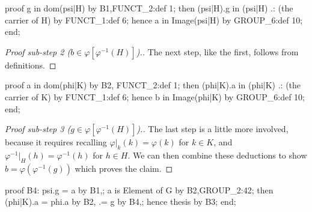 \nwenddocs{}\endmoddef\nwstartdeflinemarkup{}\nwenddeflinemarkup
proof
  g in dom(psi|H) by B1,FUNCT_2:def 1;
  then (psi|H).g in (psi|H) .: (the carrier of H) by FUNCT_1:def 6;
  hence a in Image(psi|H) by GROUP_6:def 10;
end;
\nwendcode{}\nwdocspar

\begin{proof}[{Proof sub-step 2 ($b\in\varphi[\varphi^{-1}(H)]$)}.]
The next step, like the first, follows from definitions.
\end{proof}

\nwenddocs{}\endmoddef\nwstartdeflinemarkup{}\nwenddeflinemarkup
proof
  a in dom(phi|K) by B2, FUNCT_2:def 1;
  then (phi|K).a in (phi|K) .: (the carrier of K) by FUNCT_1:def 6;
  hence b in Image(phi|K) by GROUP_6:def 10;
end;
\nwendcode{}\nwdocspar

\begin{proof}[{Proof sub-step 3 ($g\in\varphi[\varphi^{-1}(H)]$)}.]
The last step is a little more involved, because it requires
recalling $\varphi|_{k}(k)=\varphi(k)$ for $k\in K$, and
$\varphi^{-1}|_{H}(h)=\varphi^{-1}(h)$ for $h\in H$. We can then combine
these deductions to show $b=\varphi(\varphi^{-1}(g))$ which proves the claim.
\end{proof}

\nwenddocs{}\endmoddef\nwstartdeflinemarkup{}\nwenddeflinemarkup
proof
  B4: psi.g = a by B1,;
  a is Element of G by B2,GROUP_2:42;
  then (phi|K).a = phi.a by B2,
                .= g by B4,;
  hence thesis by B3;
end;
\nwendcode{}\nwdocspar

